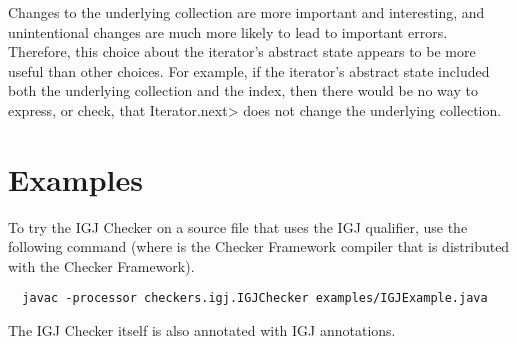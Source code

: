 Changes to the underlying collection are more important and interesting,
and unintentional changes are much more likely to lead to important
errors.  Therefore, this choice about the iterator's abstract state
appears to be more useful than other choices.  For example, if the
iterator's abstract state included both the underlying collection and
the index, then there would be no way to express, or check, that
\<Iterator.next> does not change the underlying collection.


\section{Examples\label{igj-example}}

To try the IGJ Checker on a source file that uses the IGJ qualifier, use
the following command (where  is the Checker Framework compiler that
is distributed with the Checker Framework).

\begin{Verbatim}
  javac -processor checkers.igj.IGJChecker examples/IGJExample.java
\end{Verbatim}

The IGJ Checker itself is also annotated with IGJ annotations.


